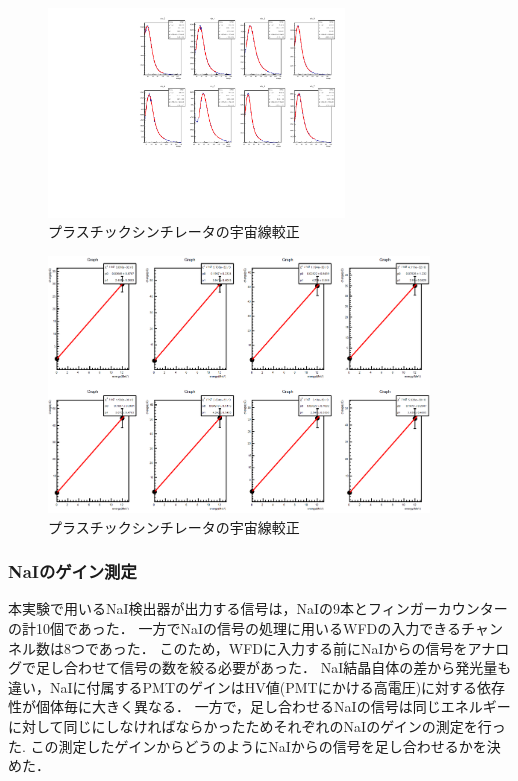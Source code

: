 \begin{figure}[H]
  \centering
  \includegraphics[width=0.7\textwidth,angle=-90]{figure/tajima/fit_langau.pdf}
  \caption{プラスチックシンチレータの宇宙線較正}\label{ps_langau}
\end{figure}
\begin{figure}[H]
  \centering
  \includegraphics[width=0.9\textwidth]{figure/tajima/fit_calibline.png}
  \caption{プラスチックシンチレータの宇宙線較正}\label{ps_cali}
\end{figure}

\subsubsection{NaIのゲイン測定}
本実験で用いるNaI検出器が出力する信号は，NaIの9本とフィンガーカウンターの計10個であった．
一方でNaIの信号の処理に用いるWFDの入力できるチャンネル数は8つであった．
このため，WFDに入力する前にNaIからの信号をアナログで足し合わせて信号の数を絞る必要があった．
NaI結晶自体の差から発光量も違い，NaIに付属するPMTのゲインはHV値(PMTにかける高電圧)に対する依存性が個体毎に大きく異なる．
一方で，足し合わせるNaIの信号は同じエネルギーに対して同じにしなければならかったためそれぞれのNaIのゲインの測定を行った.
この測定したゲインからどうのようにNaIからの信号を足し合わせるかを決めた．


